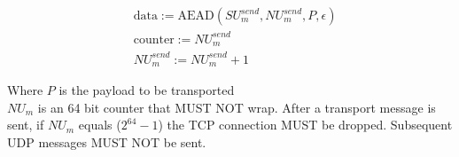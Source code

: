 \begin{align*}
    & \text{data} := \text{AEAD}(\mathit{SU}_{m}^{send}, \mathit{NU}_{m}^{send}, P, \epsilon)\\
    & \text{counter} := \mathit{NU}_{m}^{send}\\
    & \mathit{NU}_{m}^{send} := \mathit{NU}_{m}^{send} + 1
\end{align*}


Where $P$ is the payload to be transported\\

$\mathit{NU}_{m}$ is an 64 bit counter that MUST NOT wrap. After a transport message is sent, if $\mathit{NU}_{m}$ equals
($2^{64}-1$) the TCP connection MUST be dropped. Subsequent UDP messages MUST NOT be sent. \\

